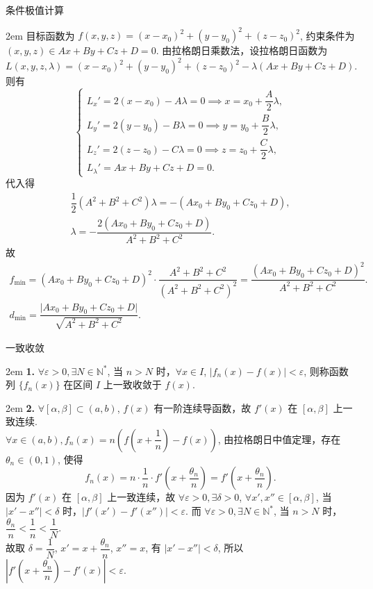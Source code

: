 \documentclass[UTF8,14pt,normal]{ctexart}
\begin{document}
 条件极值计算

    \hangindent 2em
    \noindent
    目标函数为 \(f(x, y, z) = (x - x_0)^2 + (y - y_0)^2 + (z - z_0)^2\), 约束条件为 \((x, y, z) \in Ax + By + Cz + D = 0\). 由拉格朗日乘数法，设拉格朗日函数为
    \[
        L(x, y, z, \lambda) = (x - x_0)^2 + (y - y_0)^2 + (z - z_0)^2 - \lambda(Ax + By + Cz + D).
    \]
    则有
    \[
        \begin{cases}
            L_x' = 2(x - x_0) - A \lambda = 0 \implies x = x_0 + \dfrac{A}{2} \lambda, \\[2ex]
            L_y' = 2(y - y_0) - B \lambda = 0 \implies y = y_0 + \dfrac{B}{2} \lambda, \\[2ex]
            L_z' = 2(z - z_0) - C \lambda = 0 \implies z = z_0 + \dfrac{C}{2} \lambda, \\[2ex]
            L_{\lambda}' = Ax + By + Cz + D = 0.
        \end{cases}
    \]
    代入得
    \begin{gather*}
        \dfrac{1}{2} (A^2 + B^2 + C^2) \lambda = -(Ax_0 + By_0 + Cz_0 + D), \\
        \lambda = -\dfrac{2(Ax_0 + By_0 + Cz_0 + D)}{A^2 + B^2 + C^2}.
    \end{gather*}
    故
    \begin{gather*}
        f_\mathrm{min} = (Ax_0 + By_0 + Cz_0 + D)^2 \cdot \dfrac{A^2 + B^2 + C^2}{(A^2 + B^2 + C^2)^2} = \dfrac{(Ax_0 + By_0 + Cz_0 + D)^2}{A^2 + B^2 + C^2}. \\
        d_\mathrm{min} = \dfrac{\lvert Ax_0 + By_0 + Cz_0 + D \rvert}{\sqrt{A^2 + B^2 + C^2}}.
    \end{gather*}

 一致收敛

    \hangindent 2em
    \noindent
    \textbf{1.} \(\forall \varepsilon > 0, \exists N \in \mathbb{N^*}\), 当 \(n > N\) 时，\(\forall x \in I\), \(\left\lvert f_n(x) - f(x) \right\rvert < \varepsilon\), 则称函数列 \(\{f_n(x)\}\) 在区间 \(I\) 上一致收敛于 \(f(x)\).

    \hangindent 2em
    \noindent
    \textbf{2.} \(\forall [\alpha, \beta] \subset (a, b)\), \(f(x)\) 有一阶连续导函数，故 \(f'(x)\) 在 \([\alpha, \beta]\) 上一致连续. \\[1.2ex]
    \(\forall x \in (a, b), f_n(x) = n(f(x + \dfrac{1}{n}) - f(x))\), 由拉格朗日中值定理，存在 \(\theta_n \in (0, 1)\), 使得
    \[
        f_n(x) = n \cdot \frac{1}{n} \cdot f'(x + \frac{\theta_n}{n}) = f'(x + \frac{\theta_n}{n}).
    \]
    因为 \(f'(x)\) 在 \([\alpha, \beta]\) 上一致连续，故 \(\forall \varepsilon > 0, \exists \delta > 0\), \(\forall x', x'' \in [\alpha, \beta]\), 当 \(\lvert x' - x'' \rvert < \delta\) 时，\(\lvert f'(x') - f'(x'') \rvert < \varepsilon\). 而 \(\forall \varepsilon > 0, \exists N \in \mathbb{N^*}\), 当 \(n > N\) 时，\(\dfrac{\theta_n}{n} < \dfrac{1}{n} < \dfrac{1}{N}\). \\
    故取 \(\delta = \dfrac{1}{N}\), \(x' = x + \dfrac{\theta_n}{n}\), \(x'' = x\), 有 \(\lvert x' - x'' \rvert < \delta\), 所以 \(\left\lvert f'(x + \dfrac{\theta_n}{n}) - f'(x) \right\rvert < \varepsilon\).
\end{document}
